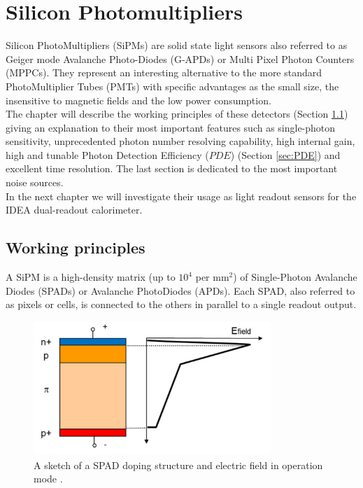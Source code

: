 \chapter{Silicon Photomultipliers}
Silicon PhotoMultipliers (SiPMs) are solid state light sensors also referred to as Geiger mode Avalanche Photo-Diodes (G-APDs) or Multi Pixel Photon Counters (MPPCs). They represent an interesting alternative to the more standard PhotoMultiplier Tubes (PMTs) with specific advantages as the small size, the insensitive to magnetic fields and the low power consumption.\\

The chapter will describe the working principles of these detectors (Section \ref{sec:SiPM_work}) giving an explanation to their most important features such as single-photon sensitivity, unprecedented photon number resolving capability, high internal gain, high and tunable Photon Detection Efficiency ($PDE$) (Section \ref{sec:PDE}) and excellent time resolution.
The last section is dedicated to the most important noise sources.\\

In the next chapter we will investigate their usage as light readout sensors for the IDEA dual-readout calorimeter.

\section{Working principles}\label{sec:SiPM_work}
A SiPM is a high-density matrix (up to $10^4$ per mm$^2$) of Single-Photon Avalanche Diodes (SPADs) or Avalanche PhotoDiodes (APDs). Each SPAD, also referred to as pixels or cells, is connected to the others in parallel to a single readout output.\\

\begin{figure}
	\centering
	\includegraphics[width=0.8\textwidth]{IMG/Cap3/APD_struc.png}
	\caption{A sketch of a SPAD doping structure and electric field in operation mode \cite{electrics}.}
	\label{fig:APD_struc}
\end{figure}

